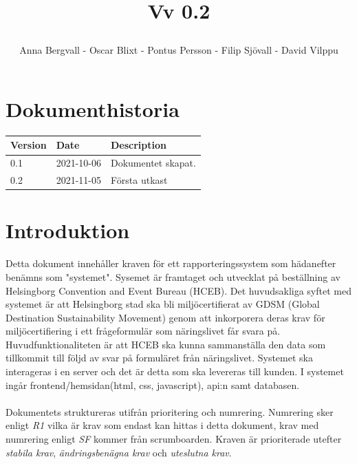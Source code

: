 \documentclass{article}
\date {#1}
\title {
    \documentNumber {01}    

    \documentTitle {Helsingborg Event and Convention Bureau}
    
    \documentDate {2021-08-20}
    \documentVersion Vv 0.2
    
    \author{Anna Bergvall - Oscar Blixt - Pontus Persson - Filip Sjövall - David Vilppu}
}
\begin{document}
\maketitle

\thispagestyle{empty}



\newpage

\tableofcontents


\newpage

\section{Dokumenthistoria}
\begin{tabular}{ l | l | l }
    Version & Date & Description \\
    \hline
    0.1 & 2021-10-06 & Dokumentet skapat. \\
    0.2 & 2021-11-05 & Första utkast\\
    
\end{tabular}

\section{Introduktion}

    Detta dokument innehåller kraven för ett rapporteringssystem som hädanefter benämns som "systemet". Sysemet är framtaget och utvecklat på beställning av Helsingborg Convention and Event Bureau (HCEB). Det huvudsakliga syftet med systemet är att Helsingborg stad ska bli miljöcertifierat av GDSM (Global Destination Sustainability Movement) genom att inkorporera deras krav för miljöcertifiering i ett frågeformulär som näringslivet får svara på. Huvudfunktionaliteten är att HCEB ska kunna sammanställa den data som tillkommit till följd av svar på formuläret från näringslivet. Systemet ska interageras i en server och det är detta som ska levereras till kunden. I systemet ingår frontend/hemsidan(html, css, javascript), api:n samt databasen. 
    \\\\
    Dokumentets struktureras utifrån prioritering och numrering. Numrering sker enligt \textit{R1} vilka är krav som endast kan hittas i detta dokument, krav med numrering enligt \textit{SF} kommer från scrumboarden. Kraven är prioriterade utefter \textit{stabila krav}, \textit{ändringsbenägna krav} och \textit{uteslutna krav}. 
    
\end{document}
